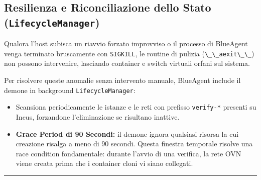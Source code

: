 \subsection{\texorpdfstring{Resilienza e Riconciliazione dello Stato
(\texttt{LifecycleManager})}{Resilienza e Riconciliazione dello Stato (LifecycleManager)}}\label{resilienza-e-riconciliazione-dello-stato-lifecyclemanager}

Qualora l'host subisca un riavvio forzato improvviso o il processo di
BlueAgent venga terminato bruscamente con
\passthrough{\lstinline!SIGKILL!}, le routine di pulizia
(\passthrough{\lstinline!\_\_aexit\_\_!}) non possono intervenire,
lasciando container e switch virtuali orfani sul sistema.

Per risolvere queste anomalie senza intervento manuale, BlueAgent
include il demone in background
\passthrough{\lstinline!LifecycleManager!}:

\begin{itemize}
\tightlist
\item
  Scansiona periodicamente le istanze e le reti con prefisso
  \passthrough{\lstinline!verify-*!} presenti su Incus, forzandone
  l'eliminazione se risultano inattive.
\item
  \textbf{Grace Period di 90 Secondi:} il demone ignora qualsiasi
  risorsa la cui creazione risalga a meno di 90 secondi. Questa finestra
  temporale risolve una race condition fondamentale: durante l'avvio di
  una verifica, la rete OVN viene creata prima che i container cloni vi
  siano collegati.
\end{itemize}

\begin{center}\rule{0.5\linewidth}{0.5pt}\end{center}
